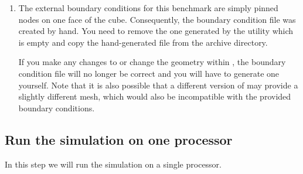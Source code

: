 \begin{enumerate}
\item The external boundary conditions for this benchmark are simply
  pinned nodes on one face of the cube. Consequently, the boundary
  condition file was created by hand. You need to remove the one
  generated by the  utility which is empty and
  copy the hand-generated file from the archive directory.

  \begin{screen}
    \shellprompt{}
    \shellprompt{}
  \end{screen}
  
  \begin{warning}
    If you make any changes to  or change the
    geometry within , the boundary condition file
     will no longer be correct and you will
    have to generate one yourself.  Note that it is also possible that
    a different version of  may provide a slightly
    different mesh, which would also be incompatible with the provided
    boundary conditions.
  \end{warning}
\end{enumerate}

\subsection{Run the simulation on one processor}

In this step we will run the simulation on a single processor.

